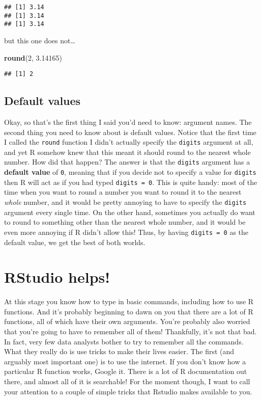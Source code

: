 \documentclass[]{book}
\newenvironment{Shaded}{\begin{snugshade}}{\end{snugshade}}
\newcommand{\DecValTok}[1]{\textcolor[rgb]{0.00,0.00,0.81}{#1}}
\newcommand{\FloatTok}[1]{\textcolor[rgb]{0.00,0.00,0.81}{#1}}
\newcommand{\KeywordTok}[1]{\textcolor[rgb]{0.13,0.29,0.53}{\textbf{#1}}}
\newcommand{\NormalTok}[1]{#1}
\begin{document}
\begin{verbatim}
## [1] 3.14
## [1] 3.14
## [1] 3.14
\end{verbatim}

but this one does not\ldots{}

\begin{Shaded}
\begin{Highlighting}[]
\KeywordTok{round}\NormalTok{(}\DecValTok{2}\NormalTok{, }\FloatTok{3.14165}\NormalTok{)}
\end{Highlighting}
\end{Shaded}

\begin{verbatim}
## [1] 2
\end{verbatim}

\hypertarget{default-values}{%
\subsection{Default values}\label{default-values}}

Okay, so that's the first thing I said you'd need to know: argument names. The second thing you need to know about is default values. Notice that the first time I called the \texttt{round} function I didn't actually specify the \texttt{digits} argument at all, and yet R somehow knew that this meant it should round to the nearest whole number. How did that happen? The answer is that the \texttt{digits} argument has a \textbf{default value} of \texttt{0}, meaning that if you decide not to specify a value for \texttt{digits} then R will act as if you had typed \texttt{digits\ =\ 0}. This is quite handy: most of the time when you want to round a number you want to round it to the nearest \emph{whole} number, and it would be pretty annoying to have to specify the \texttt{digits} argument every single time. On the other hand, sometimes you actually do want to round to something other than the nearest whole number, and it would be even more annoying if R didn't allow this! Thus, by having \texttt{digits\ =\ 0} as the default value, we get the best of both worlds.

\hypertarget{rstudio-helps}{%
\section{RStudio helps!}\label{rstudio-helps}}

At this stage you know how to type in basic commands, including how to use R functions. And it's probably beginning to dawn on you that there are a lot of R functions, all of which have their own arguments. You're probably also worried that you're going to have to remember all of them! Thankfully, it's not that bad. In fact, very few data analysts bother to try to remember all the commands. What they really do is use tricks to make their lives easier. The first (and arguably most important one) is to use the internet. If you don't know how a particular R function works, Google it. There is a lot of R documentation out there, and almost all of it is searchable! For the moment though, I want to call your attention to a couple of simple tricks that Rstudio makes available to you.
\end{document}
